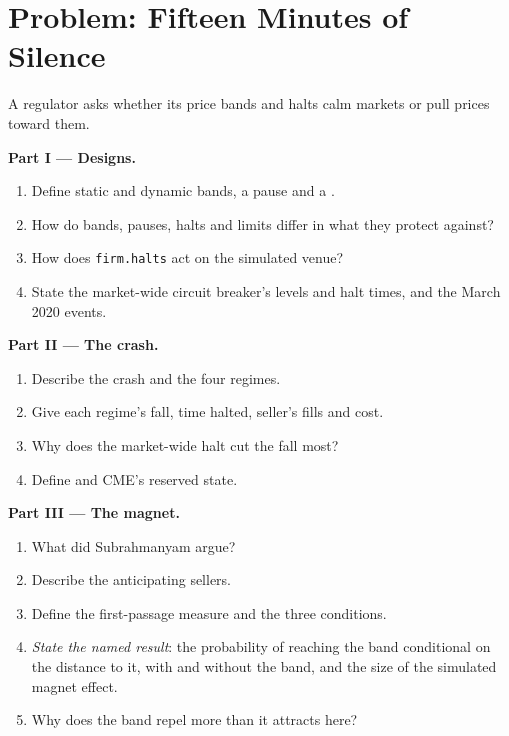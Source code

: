 \section{Problem: Fifteen Minutes of Silence}

\begin{problem}\label{pb:mx:circuit-breakers-and-halts:1}
A regulator asks whether its price bands and halts calm markets or pull prices toward them.

\medskip\noindent\textbf{Part I --- Designs.}
\begin{enumerate}
\item Define static and dynamic bands, a pause and a .
\item How do bands, pauses, halts and limits differ in what they protect against?
\item How does \texttt{firm.halts} act on the simulated venue?
\item State the market-wide circuit breaker's levels and halt times, and the March 2020 events.
\end{enumerate}

\medskip\noindent\textbf{Part II --- The crash.}
\begin{enumerate}[resume]
\item Describe the crash and the four regimes.
\item Give each regime's fall, time halted, seller's fills and cost.
\item Why does the market-wide halt cut the fall most?
\item Define  and CME's reserved state.
\end{enumerate}

\medskip\noindent\textbf{Part III --- The magnet.}
\begin{enumerate}[resume]
\item What did Subrahmanyam argue?
\item Describe the anticipating sellers.
\item Define the first-passage measure and the three conditions.
\item \emph{State the named result}: the probability of reaching the band conditional on the distance to it, with and without the band, and the size of
the simulated magnet effect.
\item Why does the band repel more than it attracts here?
\end{enumerate}


\end{problem}
